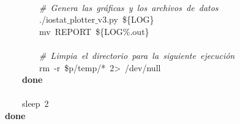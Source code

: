 \mbox{} \\
\mbox{}\ \ \ \ \ \ \ \ \textit{\#\ Genera\ las\ gráficas\ y\ los\ archivos\ de\ datos} \\
\mbox{}\ \ \ \ \ \ \ \ ./iostat$\_$plotter$\_$v3.py\ \$\{LOG\} \\
\mbox{}\ \ \ \ \ \ \ \ mv\ REPORT\ \$\{LOG\%.out\} \\
\mbox{} \\
\mbox{}\ \ \ \ \ \ \ \ \textit{\#\ Limpia\ el\ directorio\ para\ la\ siguiente\ ejecución} \\
\mbox{}\ \ \ \ \ \ \ \ rm\ -r\ \$p/temp/*\ 2\textgreater{}\ /dev/null \\
\mbox{}\ \ \ \ \textbf{done} \\
\mbox{}\ \ \ \  \\
\mbox{}\ \ \ \ sleep\ 2 \\
\mbox{}\textbf{done} \\
\mbox{}\ \ \ \ \ \ \ \  \\
\mbox{}\ \ \ \  \\
\mbox{}
